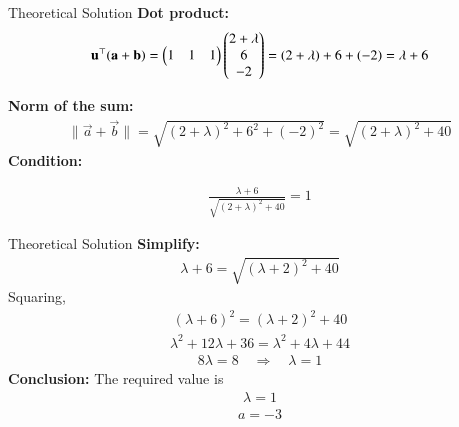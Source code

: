 \documentclass{beamer}
\begin{document}
\begin{frame}{Theoretical Solution}
\textbf{Dot product:}
\begin{align}
\mathbf u^\top(\mathbf a+\mathbf b) = \begin{pmatrix}1 & 1 & 1\end{pmatrix}\begin{pmatrix}2+\lambda\\6\\-2\end{pmatrix} 
= (2+\lambda)+6+(-2) = \lambda+6
\end{align}

\textbf{Norm of the sum:}
\begin{align}
\|\vec a+\vec b\| = \sqrt{(2+\lambda)^2+6^2+(-2)^2}
= \sqrt{(2+\lambda)^2+40}
\end{align}
 \textbf{Condition:}
 
\begin{align}
\frac{\lambda+6}{\sqrt{(2+\lambda)^2+40}} = 1
\end{align}
\end{frame}
\begin{frame}{Theoretical Solution}
\textbf{Simplify:}
\begin{align}
\lambda+6 = \sqrt{(\lambda+2)^2+40}
\end{align}
Squaring,
\begin{align}
(\lambda+6)^2 = (\lambda+2)^2+40
\end{align}
\begin{align}
\lambda^2+12\lambda+36 = \lambda^2+4\lambda+44
\end{align}
\begin{align}
8\lambda = 8 \quad \Rightarrow \quad \lambda = 1
\end{align}
\textbf{Conclusion:}  
The required value is
\begin{align}
\boxed{\lambda=1}
\end{align}
\begin{align}
\boxed{\,a = -3\,}
\end{align}

\end{frame}
\end{document}
